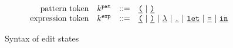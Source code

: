 \begin{figure}
\[\begin{array}{rlrl}
      \text{pattern token} & k^{\texttt{pat}} & ::= &
        \underline{\texttt{(}} ~\vert~
        \underline{\texttt{)}} \\
      \text{expression token} & k^{\texttt{exp}} & ::= &
        \underline{\texttt{(}} ~\vert~
        \underline{\texttt{)}} ~\vert~
        \underline{\lambda} ~\vert~
        \underline{\texttt{.}} ~\vert~
        \underline{\texttt{let}} ~\vert~
        \underline{\texttt{=}} ~\vert~
        \underline{\texttt{in}}
  \end{array}\]
  \caption{
    Syntax of edit states 
  }
  \label{fig:edit-state-syntax}
\end{figure}